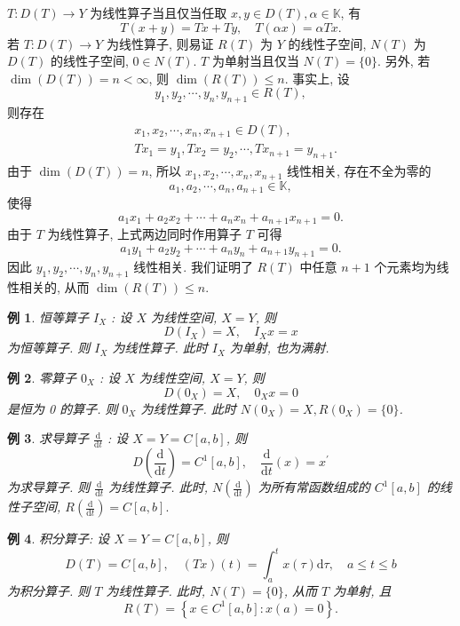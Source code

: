 \documentclass[openany]{ctexbook}
\theoremstyle{kaiti}
\theoremstyle{normal}
\newtheorem{example}{例}[section]
\begin{document}
$T: D(T) \rightarrow Y$ 为线性算子当且仅当任取 $x, y \in D(T), \alpha \in \mathbb{K}$, 有
$$
T(x+y)=T x+T y, \quad T(\alpha x)=\alpha T x.
$$
若 $T: D(T) \rightarrow Y$ 为线性算子, 则易证 $R(T)$ 为 $Y$ 的线性子空间, $N(T)$ 为 $D(T)$ 的线性子空间, $0 \in N(T)$. $T$ 为单射当且仅当 $N(T)=\{0\}$. 另外, 若 $\operatorname{dim}(D(T))=n<\infty$, 则 $\operatorname{dim}(R(T)) \leqslant n$. 事实上, 设
$$
y_1, y_2, \cdots, y_n, y_{n+1} \in R(T),
$$
则存在
$$
  \begin{aligned}
    &x_1, x_2, \cdots, x_n, x_{n+1} \in D(T), \\
    &T x_1=y_1, T x_2=y_2, \cdots, T x_{n+1}=y_{n+1}.
  \end{aligned}
$$
由于 $\operatorname{dim}(D(T))=n$, 所以 $x_1, x_2, \cdots, x_n, x_{n+1}$ 线性相关, 存在不全为零的
$$
a_1, a_2, \cdots, a_n, a_{n+1} \in \mathbb{K},
$$
使得
$$
a_1 x_1+a_2 x_2+\cdots+a_n x_n+a_{n+1} x_{n+1}=0.
$$
由于 $T$ 为线性算子, 上式两边同时作用算子 $T$ 可得
$$
a_1 y_1+a_2 y_2+\cdots+a_n y_n+a_{n+1} y_{n+1}=0.
$$
因此 $y_1, y_2, \cdots, y_n, y_{n+1}$ 线性相关. 我们证明了 $R(T)$ 中任意 $n+1$ 个元素均为线性相关的, 从而 $\operatorname{dim}(R(T)) \leqslant n$.

\begin{example}
恒等算子 $I_{X}$ : 设 $X$ 为线性空间, $X=Y$, 则
$$
D\left(I_{X}\right)=X, \quad I_{X} x=x
$$
为恒等算子. 则 $I_{X}$ 为线性算子. 此时 $I_{X}$ 为单射, 也为满射.
\end{example}

\begin{example}
零算子 $0_{X}$ : 设 $X$ 为线性空间, $X=Y$, 则
$$
D\left(0_{X}\right)=X, \quad 0_{X} x=0
$$
是恒为 0 的算子. 则 $0_{X}$ 为线性算子. 此时 $N\left(0_{X}\right)=X, R\left(0_{X}\right)=\{0\}$.
\end{example}

\begin{example}
求导算子 $\frac{\mathrm{d}}{\mathrm{d} t}$ : 设 $X=Y=C[a, b]$, 则
$$
D\left(\frac{\mathrm{d}}{\mathrm{d} t}\right)=C^1[a, b], \quad \frac{\mathrm{d}}{\mathrm{d} t}(x)=x^{\prime}
$$
为求导算子. 则 $\frac{\mathrm{d}}{\mathrm{d} t}$ 为线性算子. 此时, $N\left(\frac{\mathrm{d}}{\mathrm{d} t}\right)$ 为所有常函数组成的 $C^1[a, b]$ 的线性子空间, $R\left(\frac{\mathrm{d}}{\mathrm{d} t}\right)=C[a, b].$
\end{example}

\begin{example}
积分算子: 设 $X=Y=C[a, b]$, 则
$$
D(T)=C[a, b], \quad(T x)(t)=\int_{a}^{t} x(\tau) \mathrm{d} \tau, \quad a \leqslant t \leqslant b
$$
为积分算子. 则 $T$ 为线性算子. 此时, $N(T)=\{0\}$, 从而 $T$ 为单射, 且
$$
R(T)=\left\{x \in C^1[a, b]: x(a)=0\right\}.
$$
\end{example}
\end{document}
